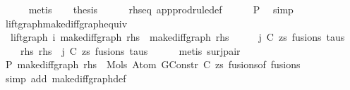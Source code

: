 \begin{isabellebody}
\ \ \ \ \isamarkupfalse%
\ metis\isanewline
\isanewline
\ \ \isamarkupfalse%
\ {\isacharquery}{\kern0pt}thesis\isanewline
\ \ \ \ \isamarkupfalse%
\ rhs{\isacharunderscore}{\kern0pt}eq\ app{\isacharunderscore}{\kern0pt}prodrule{\isacharunderscore}{\kern0pt}def\isanewline
\ \ \ \ \isamarkupfalse%
\ P{}\ \isamarkupfalse%
\ simp\isanewline
{}\isamarkupfalse%
%
\endisatagproof
{\isafoldproof}%
%
\isadelimproof
\isanewline
%
\endisadelimproof
\isanewline
\isanewline
{}\isamarkupfalse%
\ lift{\isacharunderscore}{\kern0pt}graph{\isacharunderscore}{\kern0pt}make{\isacharunderscore}{\kern0pt}diffgraph{\isacharunderscore}{\kern0pt}equiv{\isacharcolon}{\kern0pt}\isanewline
\ \ {\isachardoublequoteopen}lift{\isacharunderscore}{\kern0pt}graph\ i\ {\isacharparenleft}{\kern0pt}make{\isacharunderscore}{\kern0pt}diffgraph\ rhs{\isacharparenright}{\kern0pt}\ {\isacharequal}{\kern0pt}\ make{\isacharunderscore}{\kern0pt}diffgraph\ rhs{\isachardoublequoteclose}\isanewline
%
\isadelimproof
%
\endisadelimproof
%
\isatagproof
{}\isamarkupfalse%
\ {\isacharminus}{\kern0pt}\isanewline
\ \ \isamarkupfalse%
\ j\ C\ zs\ fusions\ taus\ \isanewline
\ \ \ \ rhs{\isacharcolon}{\kern0pt}\ {\isachardoublequoteopen}rhs\ {\isacharequal}{\kern0pt}\ {\isacharparenleft}{\kern0pt}j{\isacharcomma}{\kern0pt}\ {\isacharparenleft}{\kern0pt}C{\isacharcomma}{\kern0pt}\ zs{\isacharparenright}{\kern0pt}{\isacharcomma}{\kern0pt}\ fusions{\isacharcomma}{\kern0pt}\ taus{\isacharparenright}{\kern0pt}{\isachardoublequoteclose}\isanewline
\ \ \ \ \isamarkupfalse%
\ {\isacharparenleft}{\kern0pt}metis\ surj{\isacharunderscore}{\kern0pt}pair{\isacharparenright}{\kern0pt}\isanewline
\isanewline
\ \ \isamarkupfalse%
\ P{}{\isacharcolon}{\kern0pt}\ {\isachardoublequoteopen}make{\isacharunderscore}{\kern0pt}diffgraph\ rhs\ {\isacharequal}{\kern0pt}\ Mols{}\ {\isacharparenleft}{\kern0pt}Atom\ {\isacharparenleft}{\kern0pt}GConstr\ C{\isacharparenright}{\kern0pt}\ zs{\isacharparenright}{\kern0pt}\ {\isacharparenleft}{\kern0pt}fusions{\isacharunderscore}{\kern0pt}of\ fusions{\isacharparenright}{\kern0pt}{\isachardoublequoteclose}\isanewline
\ \ \ \ \isamarkupfalse%
\ {\isacharparenleft}{\kern0pt}simp\ add{\isacharcolon}{\kern0pt}\ make{\isacharunderscore}{\kern0pt}diffgraph{\isacharunderscore}{\kern0pt}def{\isacharparenright}{\kern0pt}\isanewline

\end{isabellebody}
